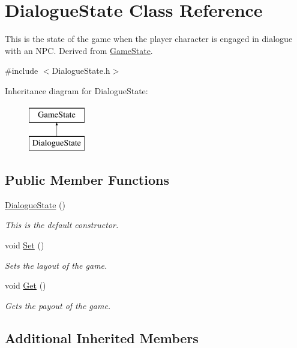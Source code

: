 \hypertarget{classDialogueState}{\section{Dialogue\-State Class Reference}
\label{classDialogueState}
}


This is the state of the game when the player character is engaged in dialogue with an N\-P\-C. Derived from \hyperlink{classGameState}{Game\-State}.  




{\ttfamily \#include $<$Dialogue\-State.\-h$>$}

Inheritance diagram for Dialogue\-State\-:\begin{figure}[H]
\begin{center}
\leavevmode
\includegraphics[height=2.000000cm]{classDialogueState}
\end{center}
\end{figure}
\subsection*{Public Member Functions}
\begin{DoxyCompactItemize}
\item 
\hyperlink{classDialogueState_a622d0916c1329a5e13675e4d7aff3b79}{Dialogue\-State} ()
\begin{DoxyCompactList}\small\item\em This is the default constructor. \end{DoxyCompactList}\item 
void \hyperlink{classDialogueState_a203e463dc924a2492db74b749b81b9f1}{Set} ()
\begin{DoxyCompactList}\small\item\em Sets the layout of the game. \end{DoxyCompactList}\item 
void \hyperlink{classDialogueState_ab2f436b23d15e13cda1d756b8d47a982}{Get} ()
\begin{DoxyCompactList}\small\item\em Gets the payout of the game. \end{DoxyCompactList}\end{DoxyCompactItemize}
\subsection*{Additional Inherited Members}


